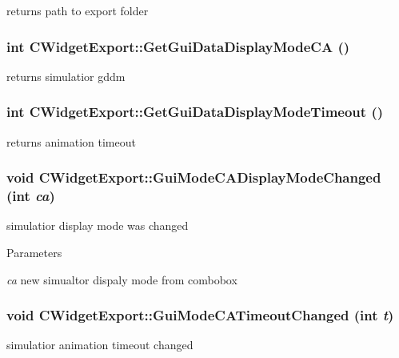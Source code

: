 \label{classCWidgetExport_a869e5eda5f0b9c54c4c3d271f563e60a}
returns path to export folder \hypertarget{classCWidgetExport_ad78773bd4358d9c2fb44c454936f9d48}{
\subsubsection[{GetGuiDataDisplayModeCA}]{\setlength{\rightskip}{0pt plus 5cm}int CWidgetExport::GetGuiDataDisplayModeCA ()}}
\label{classCWidgetExport_ad78773bd4358d9c2fb44c454936f9d48}
returns simulatior gddm \hypertarget{classCWidgetExport_ac3d5ad813625f37314a4eb2336094378}{
\subsubsection[{GetGuiDataDisplayModeTimeout}]{\setlength{\rightskip}{0pt plus 5cm}int CWidgetExport::GetGuiDataDisplayModeTimeout ()}}
\label{classCWidgetExport_ac3d5ad813625f37314a4eb2336094378}
returns animation timeout \hypertarget{classCWidgetExport_af48eb2f412398a4e902b44df7e9f2a72}{
\subsubsection[{GuiModeCADisplayModeChanged}]{\setlength{\rightskip}{0pt plus 5cm}void CWidgetExport::GuiModeCADisplayModeChanged (int {\em ca})}}
\label{classCWidgetExport_af48eb2f412398a4e902b44df7e9f2a72}
simulatior display mode was changed


\begin{DoxyParams}{Parameters}
\item[{\em ca}]new simualtor dispaly mode from combobox \end{DoxyParams}
\hypertarget{classCWidgetExport_adf47bf479d792c80723ab22e1aea0465}{
\subsubsection[{GuiModeCATimeoutChanged}]{\setlength{\rightskip}{0pt plus 5cm}void CWidgetExport::GuiModeCATimeoutChanged (int {\em t})}}
\label{classCWidgetExport_adf47bf479d792c80723ab22e1aea0465}
simulatior animation timeout changed


